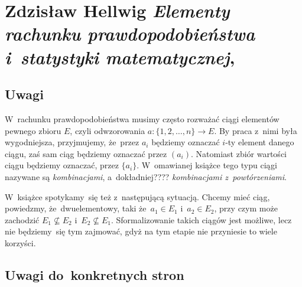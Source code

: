 \documentclass[a4paper,11pt]{article}
\numberwithin{equation}{section}
\begin{document}
\VerSpaceSix













\section{Zdzisław Hellwig \textit{Elementy rachunku
    prawdopodobieństwa i~statystyki matematycznej},
  \parencite{Hellwig-Elementy-rachunku-prawdopodobienstwa-ETC-Pub-1987}}

\label{sec:Hellwig-Elementy-Rachunku-ETC}



\subsection{Uwagi}

\label{subsec:Uwagi}


W~rachunku prawdopodobieństwa musimy często rozważać ciągi elementów
pewnego zbioru $E$, czyli odwzorowania $a : \{ 1, 2,\ldots, n \} \to E$. By praca
z~nimi była wygodniejsza, przyjmujemy, że~przez $a_{ i }$ będziemy oznaczać
$i$-ty element danego ciągu, zaś sam ciąg będziemy oznaczać przez
$( a_{ i } )$. Natomiast zbiór wartości ciągu będziemy oznaczać, przez
$\{ a_{ i } \}$. W~omawianej książce tego typu ciągi nazywane są
\textit{kombinacjami},
a~dokładniej???? \textit{kombinacjami z~powtórzeniami}.

W~książce spotykamy~się też z~następującą sytuacją. Chcemy mieć ciąg,
powiedzmy, że~dwuelementowy, taki że~$a_{ 1 } \in E_{ 1 }$ i~$a_{ 2 } \in E_{ 2 }$,
przy czym może zachodzić $E_{ 1 } \nsubseteq E_{ 2 }$ i~$E_{ 2 } \nsubseteq E_{ 1 }$.
Sformalizowanie takich ciągów jest możliwe, lecz nie będziemy~się tym
zajmować, gdyż na tym etapie nie przyniesie to wiele korzyści.










\subsection{Uwagi do~konkretnych stron}
\end{document}
